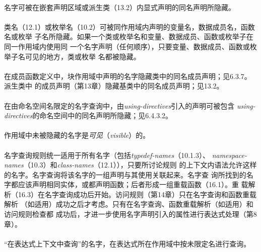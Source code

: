 \paragraph{}
名字可被在嵌套声明区域或派生类（13.2）内显式声明的同名声明所隐藏。

\paragraph{}
类名（12.1）或枚举名（10.2）可被同作用域内声明的变量名，数据成员名，函数名或枚举
子名所隐藏。如果一个类或枚举名和变量、数据成员、函数或枚举子在同一作用域内使用同
一个名字声明（任何顺序），只要变量、数据成员、函数或枚举子名可见的地方，类或枚举
名都被隐藏。

\paragraph{}
在成员函数定义中，块作用域中声明的名字隐藏类中的同名成员声明；见6.3.7。派生类中
的成员声明（第13章）隐藏基类中的同名成员声明；见13.2。

\paragraph{}
在由命名空间名限定的名字查询中，由\textit{using-directives}引入的声明可被包含
\textit{using-directives}的命名空间中的同名声明所隐藏；见6.4.3.2。

\paragraph{}
作用域中未被隐藏的名字是\textit{可见}（\textit{visible}）的。


\paragraph{}
名字查询规则统一适用于所有名字（包括\textit{typedef-names}（10.1.3）、
\textit{namespace-names}（10.3）和\textit{class-names}（12.1）），只要所讨论规则
的上下文内语法允许这样的名字。名字查询将该名字的一组声明与其使用关联起来。名字查
询所找到的名字都应该声明相同实体，或都声明函数；后者形成一组重载函数（16.1）。重
载解析（16.3）在名字查询成功后开始。访问规则（第14章）只在名字查询和函数重载解析
（如适用）成功之后才考虑。只有在名字查询、函数重载解析（如适用）和访问规则检查都
成功后，才进一步使用名字声明引入的属性进行表达式处理（第8章）。

\paragraph{}
``在表达式上下文中查询''的名字，在表达式所在作用域中按未限定名进行查询。

